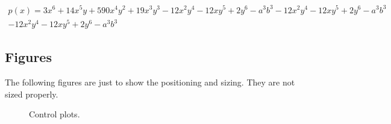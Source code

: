 \begin{multline*}
p(x) = 3x^6 + 14x^5y + 590x^4y^2 + 19x^3y^3- 12x^2y^4 - 12xy^5 + 2y^6 - a^3b^3 - 12x^2y^4 - 12xy^5 + 2y^6 - a^3b^3 \\ 
- 12x^2y^4 - 12xy^5 + 2y^6 - a^3b^3
\end{multline*}

\newpage
\subsection{Figures}

The following figures are just to show the positioning and sizing. They are not sized properly.

\begin{figure}[H] %
	\centering
	\hfill
	\caption{Control plots.}
\end{figure}

